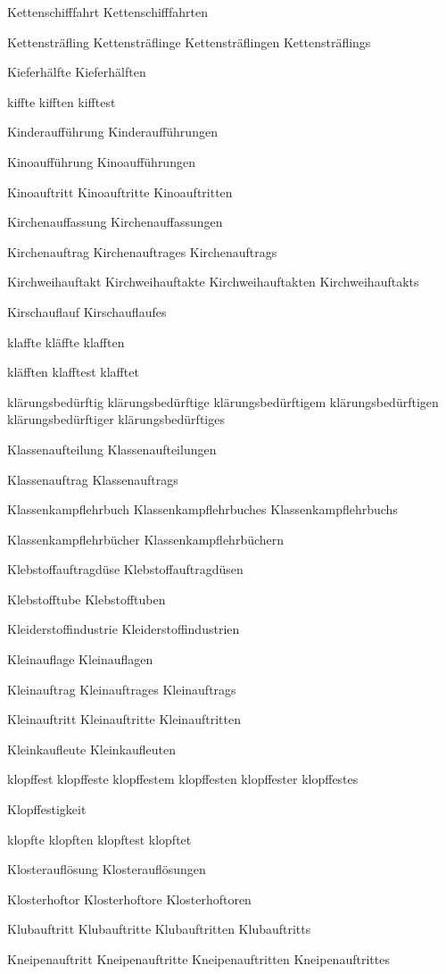 Kettenschifffahrt
Kettenschifffahrten

Kettensträfling
Kettensträflinge
Kettensträflingen
Kettensträflings

Kieferhälfte
Kieferhälften

kiffte
kifften
kifftest

Kinderaufführung
Kinderaufführungen

Kinoaufführung
Kinoaufführungen

Kinoauftritt
Kinoauftritte
Kinoauftritten

Kirchenauffassung
Kirchenauffassungen

Kirchenauftrag
Kirchenauftrages
Kirchenauftrags

Kirchweihauftakt
Kirchweihauftakte
Kirchweihauftakten
Kirchweihauftakts

Kirschauflauf
Kirschauflaufes

klaffte
kläffte
klafften

kläfften
klafftest
klafftet

klärungsbedürftig
klärungsbedürftige
klärungsbedürftigem
klärungsbedürftigen
klärungsbedürftiger
klärungsbedürftiges

Klassenaufteilung
Klassenaufteilungen

Klassenauftrag
Klassenauftrags

Klassenkampflehrbuch
Klassenkampflehrbuches
Klassenkampflehrbuchs

Klassenkampflehrbücher
Klassenkampflehrbüchern

Klebstoffauftragdüse
Klebstoffauftragdüsen

Klebstofftube
Klebstofftuben

Kleiderstoffindustrie
Kleiderstoffindustrien

Kleinauflage
Kleinauflagen

Kleinauftrag
Kleinauftrages
Kleinauftrags

Kleinauftritt
Kleinauftritte
Kleinauftritten

Kleinkaufleute
Kleinkaufleuten

klopffest
klopffeste
klopffestem
klopffesten
klopffester
klopffestes

Klopffestigkeit

klopfte
klopften
klopftest
klopftet

Klosterauflösung
Klosterauflösungen

Klosterhoftor
Klosterhoftore
Klosterhoftoren

Klubauftritt
Klubauftritte
Klubauftritten
Klubauftritts

Kneipenauftritt
Kneipenauftritte
Kneipenauftritten
Kneipenauftrittes

